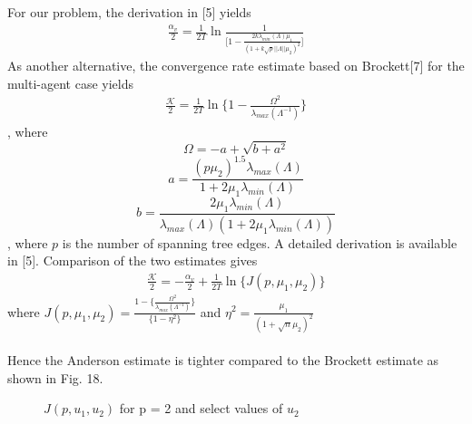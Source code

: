 \documentclass[journal]{IEEEtran}
\begin{document}
For our problem, the derivation in [5] yields \begin{align}\frac{\alpha_v}{2} = \frac{1}{2T}\ln\frac{1}{\Big[1-\frac{2k\lambda_{min}(\Lambda)\mu_1}{(1+k\sqrt{p}||\Lambda||\mu_2)^2}\Big]}\end{align} As another alternative, the convergence rate estimate based on Brockett[7] for the multi-agent case yields\begin{align}\frac{\mathcal{K}}{2} = \frac{1}{2T}\ln\Big\{1-\frac{\Omega^2}{\lambda_{max}(\Lambda^{-1})}\Big\}\end{align}, where $$\Omega = -a+\sqrt{b+a^2}$$$$ a = \frac{(p\mu_2)^{1.5}\lambda_{max}(\Lambda)}{1+2\mu_1\lambda_{min}(\Lambda)}$$$$b = \frac{2\mu_1\lambda_{min}(\Lambda)}{\lambda_{max}(\Lambda)(1+2\mu_1\lambda_{min}(\Lambda))}$$, where $p$ is the number of spanning tree edges. A detailed derivation is available in [5]. Comparison of the two estimates gives \begin{align}\frac{\mathcal{K}}{2} = -\frac{\alpha_v}{2}+\frac{1}{2T}\ln\{J(p,\mu_1,\mu_2)\}\end{align} where $J(p,\mu_1,\mu_2) = \frac{1-\Big\{\frac{\Omega^2}{\lambda_{max}(\Lambda^{-1})}\Big\}}{\{1-\eta^2\}}$ and $\eta^2 = \frac{\mu_1}{(1+\sqrt{n}\mu_2)^2}$ 
\\\\
Hence the Anderson estimate is tighter compared to the Brockett estimate as shown in Fig. 18.
\begin{figure}[h]
\caption{$J(p,u_1,u_2) $ for p = 2 and select values of $u_2$} \end{figure}
\end{document}
